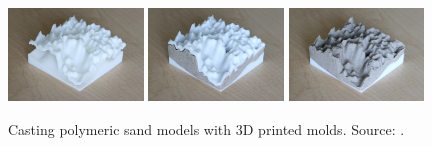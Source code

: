 \documentclass[prodmode,acmtochi]{acmsmall} %
\begin{document}
\begin{figure}
\begin{center}
		\includegraphics[width=0.32\textwidth]{images/3d_print/3d_print_1.jpg}
		\includegraphics[width=0.32\textwidth]{images/3d_print/3d_print_2.jpg}
		\includegraphics[width=0.32\textwidth]{images/3d_print/3d_print_3.jpg}
	\caption{Casting polymeric sand models with 3D printed molds. Source: \cite{Petrasova2015}.}
	\label{fig:casting}
\end{center}
\end{figure}
\end{document}

